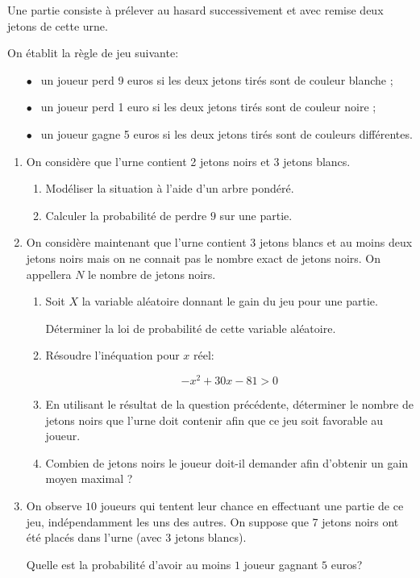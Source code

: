 \documentclass[10pt,a4paper]{article}
\newcommand{\euro}{\eurologo{}}
\begin{document}
Une partie consiste à prélever au hasard successivement et avec remise deux jetons de cette urne.

On établit la règle de jeu suivante:

\setlength\parindent{1cm}
\begin{itemize}
\item[$\bullet~~$] un joueur perd 9 euros si les deux jetons tirés sont de couleur blanche ;
\item[$\bullet~~$] un joueur perd 1 euro si les deux jetons tirés sont de couleur noire ;
\item[$\bullet~~$] un joueur gagne 5 euros si les deux jetons tirés sont de couleurs différentes.
\end{itemize}
\setlength\parindent{0cm}

\medskip

\begin{enumerate}
\item On considère que l'urne contient 2 jetons noirs et 3 jetons blancs.
	\begin{enumerate}
		\item Modéliser la situation à l'aide d'un arbre pondéré.
		\item Calculer la probabilité de perdre $9$ \euro{} sur une partie.
	\end{enumerate}	
\item On considère maintenant que l'urne contient 3 jetons blancs et au moins deux jetons noirs mais on ne connait pas le nombre exact de jetons noirs. On appellera $N$ le nombre de jetons noirs.
	\begin{enumerate}
		\item Soit $X$ la variable aléatoire donnant le gain du jeu pour une partie.
		
Déterminer la loi de probabilité de cette variable aléatoire.
		\item Résoudre l'inéquation pour $x$ réel:
		
\[-x^2  + 30x - 81 > 0\]

		\item En utilisant le résultat de la question précédente, déterminer le nombre de jetons noirs que l'urne doit contenir afin que ce jeu soit favorable au joueur.
		\item Combien de jetons noirs le joueur doit-il demander afin d'obtenir un gain moyen maximal ?
	\end{enumerate}
\item On observe $10$ joueurs qui tentent leur chance en effectuant une partie de ce jeu, indépendamment les uns des autres. On suppose que 7 jetons noirs ont été placés dans l'urne (avec 3 jetons blancs). 

Quelle est la probabilité d'avoir au moins $1$ joueur gagnant $5$ euros?
\end{enumerate}
\newpage
\hypertarget{Asie1}{}
\end{document}
